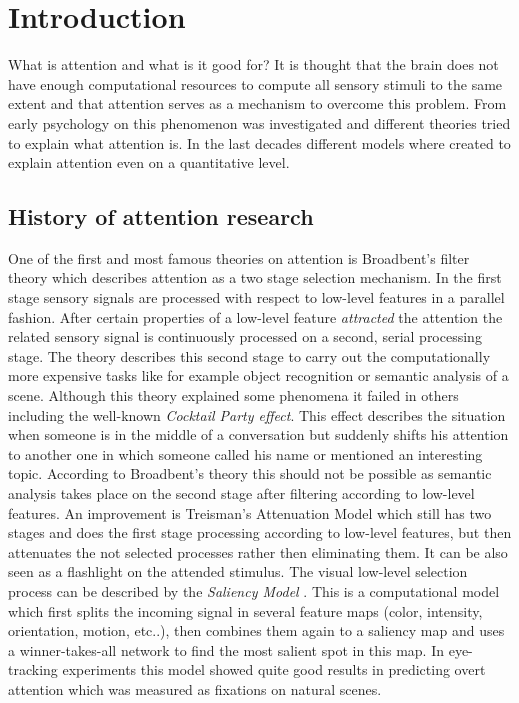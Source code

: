 \chapter{Introduction} %
\label{sg:cha:introduction}

What is attention and what is it good for? It is thought that the brain does not have enough computational resources to compute all sensory stimuli to the same extent and that attention serves as a mechanism to overcome this problem. From early psychology on this phenomenon was investigated \citep{James:1890tq} and different theories tried to explain what attention is. In the last decades different models where created to explain attention even on a quantitative level.

\section{History of attention research} %
\label{sg:sec:attention_as_selection}

One of the first and most famous theories on attention is Broadbent's filter theory \citep{Broadbent:1958ve} which describes attention as a two stage selection mechanism. In the first stage sensory signals are processed with respect to low-level features in a parallel fashion. After certain properties of a low-level feature \emph{attracted} the attention the related sensory signal is continuously processed on a second, serial processing stage. The theory describes this second stage to carry out the computationally more expensive tasks like for example object recognition or semantic analysis of a scene. Although this theory explained some phenomena it failed in others including the well-known \emph{Cocktail Party effect}. This effect describes the situation when someone is in the middle of a conversation but suddenly shifts his attention to another one in which someone called his name or mentioned an interesting topic. According to Broadbent's theory this should not be possible as semantic analysis takes place on the second stage after filtering according to low-level features. An improvement is Treisman's Attenuation Model \citep{Treisman:1964th} which still has two stages and does the first stage processing according to low-level features, but then attenuates the not selected processes rather then eliminating them. It can be also seen as a flashlight on the attended stimulus.
The visual low-level selection process can be described by the \emph{Saliency Model} \citep{Koch:1985wv}. This is a computational model which first splits the incoming signal in several feature maps (color, intensity, orientation, motion, etc..), then combines them again to a saliency map and uses a winner-takes-all network to find the most salient spot in this map. In eye-tracking experiments this model showed quite good results in predicting overt attention which was measured as fixations on natural scenes.

